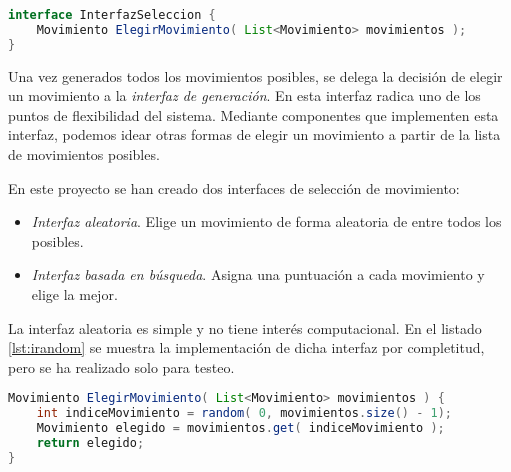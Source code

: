 \begin{lstlisting}[caption={Interfaz de generación},label={lst:igen},language=Java,escapechar=|]
interface InterfazSeleccion {
	Movimiento ElegirMovimiento( List<Movimiento> movimientos );
}
\end{lstlisting}

Una vez generados todos los movimientos posibles, se delega la decisión de elegir un movimiento a la \emph{interfaz de generación}. En esta interfaz radica uno de los puntos de flexibilidad del sistema. Mediante componentes que implementen esta interfaz, podemos idear otras formas de elegir un movimiento a partir de la lista de movimientos posibles.

En este proyecto se han creado dos interfaces de selección de movimiento:

\begin{itemize}
	\item \emph{Interfaz aleatoria}. Elige un movimiento de forma aleatoria de entre todos los posibles.
	\item \emph{Interfaz basada en búsqueda}. Asigna una puntuación a cada movimiento y elige la mejor.
\end{itemize}

La interfaz aleatoria es simple y no tiene interés computacional. En el listado \ref{lst:irandom} se muestra la implementación de dicha interfaz por completitud, pero se ha realizado solo para testeo.

\begin{lstlisting}[caption={Implementación aleatoria de la interfaz de selección de movimiento},label={lst:irandom},language=Java,escapechar=|]
Movimiento ElegirMovimiento( List<Movimiento> movimientos ) {
	int indiceMovimiento = random( 0, movimientos.size() - 1);
	Movimiento elegido = movimientos.get( indiceMovimiento );
	return elegido;
}
\end{lstlisting}

